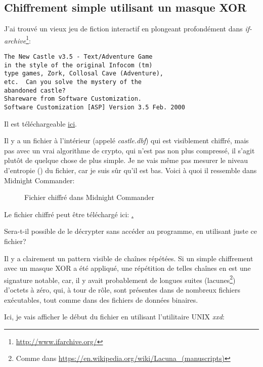 \subsection{Chiffrement simple utilisant un masque XOR}
\label{XOR_mask_1}

J'ai trouvé un vieux jeu de fiction interactif en plongeant profondément dans \emph{if-archive}\footnote{\url{http://www.ifarchive.org/}}:

\begin{lstlisting}
The New Castle v3.5 - Text/Adventure Game
in the style of the original Infocom (tm)
type games, Zork, Collosal Cave (Adventure),
etc.  Can you solve the mystery of the
abandoned castle?
Shareware from Software Customization.
Software Customization [ASP] Version 3.5 Feb. 2000
\end{lstlisting}

Il est téléchargeable
\href{\GitHubBlobMasterURL/ff/XOR/mask_1/files/newcastle.tgz}{ici}.

Il y a un fichier à l'intérieur (appelé \emph{castle.dbf}) qui est visiblement chiffré,
mais pas avec un vrai algorithme de crypto, qui n'est pas non plus compressé, il
s'agit plutôt de quelque chose de plus simple.
Je ne vais même pas mesurer le niveau d'entropie () du fichier, car
je suis sûr qu'il est bas.
Voici à quoi il ressemble dans Midnight Commander:

\begin{figure}[H]
\centering
{}
\caption{Fichier chiffré dans Midnight Commander}
\end{figure}

Le fichier chiffré peut être téléchargé ici:
\href{\GitHubBlobMasterURL/ff/XOR/mask_1/files/castle.dbf.bz2}.

Sera-t-il possible de le décrypter sans accéder au programme, en utilisant juste ce
fichier?

Il y a clairement un pattern visible de chaînes répétées.
Si un simple chiffrement avec un masque XOR a été appliqué, une répétition de telles
chaînes en est une signature notable, car, il y avait probablement de longues
suites (lacunes\footnote{Comme dans \url{https://en.wikipedia.org/wiki/Lacuna_(manuscripts)}})
d'octets à zéro, qui, à tour de rôle, sont présentes dans de nombreux
fichiers exécutables, tout comme dans des fichiers de données binaires.

Ici, je vais afficher le début du fichier en utilisant l'utilitaire UNIX \emph{xxd}:

